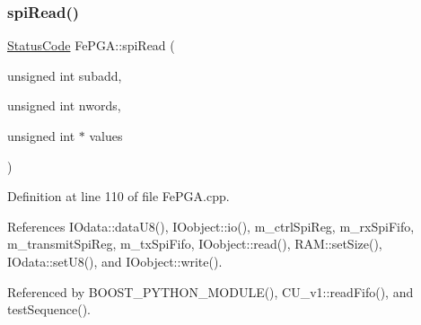 \subsubsection{\texorpdfstring{spi\+Read()}{spiRead()}\hspace{0.1cm}{\footnotesize\ttfamily [1/3]}}
{\footnotesize\ttfamily \hyperlink{classStatusCode}{Status\+Code} Fe\+P\+G\+A\+::spi\+Read (\begin{DoxyParamCaption}\item[{unsigned int}]{subadd,  }\item[{unsigned int}]{nwords,  }\item[{unsigned int $\ast$}]{values }\end{DoxyParamCaption})}



Definition at line 110 of file Fe\+P\+G\+A.\+cpp.



References I\+Odata\+::data\+U8(), I\+Oobject\+::io(), m\+\_\+ctrl\+Spi\+Reg, m\+\_\+rx\+Spi\+Fifo, m\+\_\+transmit\+Spi\+Reg, m\+\_\+tx\+Spi\+Fifo, I\+Oobject\+::read(), R\+A\+M\+::set\+Size(), I\+Odata\+::set\+U8(), and I\+Oobject\+::write().



Referenced by B\+O\+O\+S\+T\+\_\+\+P\+Y\+T\+H\+O\+N\+\_\+\+M\+O\+D\+U\+L\+E(), C\+U\+\_\+v1\+::read\+Fifo(), and test\+Sequence().


